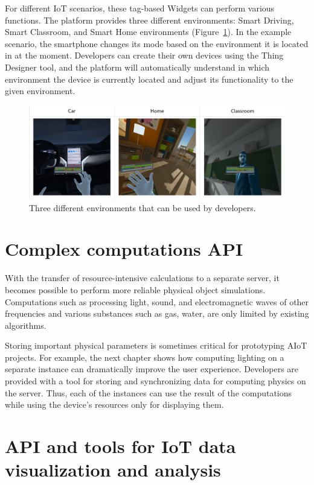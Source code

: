 For different IoT scenarios, these tag-based Widgets can perform various functions. The platform provides three different environments: Smart Driving, Smart Classroom, and Smart Home environments (Figure~\ref{fig:Environments-figure}). In the example scenario, the smartphone changes its mode based on the environment it is located in at the moment. Developers can create their own devices using the Thing Designer tool, and the platform will automatically understand in which environment the device is currently located and adjust its functionality to the given environment. 

\begin{figure}
  \centering
  \includegraphics[width=0.9\linewidth]{figures/Environments.png}
  \caption{Three different environments that can be used by developers.}
  \label{fig:Environments-figure}
\end{figure}

\section{Complex computations API}

With the transfer of resource-intensive calculations to a separate server, it becomes possible to perform more reliable physical object simulations. Computations such as processing light, sound, and electromagnetic waves of other frequencies and various substances such as gas, water, are only limited by existing algorithms. 

Storing important physical parameters is sometimes critical for prototyping AIoT projects. For example, the next chapter shows how computing lighting on a separate instance can dramatically improve the user experience. Developers are provided with a tool for storing and synchronizing data for computing physics on the server. Thus, each of the instances can use the result of the computations while using the device's resources only for displaying them. 

\section{API and tools for IoT data visualization and analysis}

